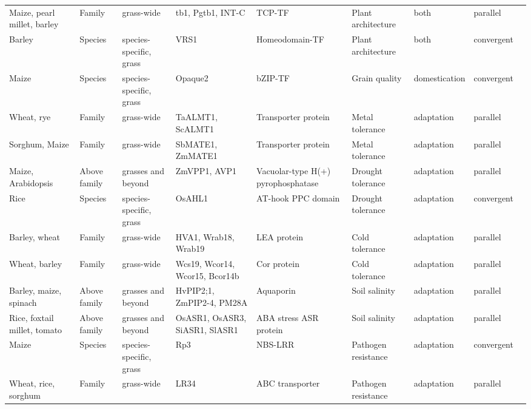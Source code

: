 \documentclass[12pt]{article}
\begin{document}
\begin{table}
\begin{center}
\begin{tabular}{G{3.5cm}G{2.5cm}C{3.10cm}C{3.5cm}C{1.95cm}G{2.0cm}G{1.8cm}G{1.5cm}G{1.5cm}}
Maize, pearl millet, barley & Family & grass-wide & tb1, Pgtb1, INT-C & TCP-TF & Plant architecture & both & parallel & \citep{Studer2011, Remigereau2011, Ramsay2011}\\
Barley & Species & species-specific, grass & VRS1 & Homeodomain-TF & Plant architecture & both & convergent & \citep{Martin2013}\\
Maize & Species & species-specific, grass & Opaque2 & bZIP-TF & Grain quality & domestication & convergent & \citep{Martin2013}\\
Wheat, rye & Family & grass-wide & TaALMT1, ScALMT1 & Transporter protein & Metal tolerance & adaptation & parallel & \citep{Martin2013}\\
Sorghum, Maize & Family & grass-wide & SbMATE1, ZmMATE1 & Transporter protein & Metal tolerance & adaptation & parallel & \citep{Martin2013}\\
Maize, Arabidopsis & Above family & grasses and beyond & ZmVPP1, AVP1 & Vacuolar-type H(+) pyrophosphatase & Drought tolerance & adaptation & parallel & \citep{Wang2016}\\
Rice & Species & species-specific, grass & OsAHL1 & AT-hook PPC domain & Drought tolerance & adaptation & convergent & \citep{Zhou2016}\\
Barley, wheat & Family & grass-wide & HVA1, Wrab18, Wrab19 & LEA protein & Cold tolerance & adaptation & parallel & \citep{Hong1988, pmid16755132}\\
Wheat, barley & Family & grass-wide & Wcs19, Wcor14, Wcor15, Bcor14b & Cor protein & Cold tolerance & adaptation & parallel & \citep{Takumi2003}\\
Barley, maize, spinach & Above family & grasses and beyond & HvPIP2;1, ZmPIP2-4, PM28A & Aquaporin & Soil salinity & adaptation & parallel & \citep{Katsuhara2002, Zhu2005, Fotiadis2000}\\
Rice, foxtail millet, tomato & Above family & grasses and beyond & OsASR1, OsASR3, SiASR1, SlASR1 & ABA stress ASR protein & Soil salinity & adaptation & parallel & \citep{Li2017, Konrad2008}\\
Maize & Species & species-specific, grass & Rp3 & NBS-LRR & Pathogen resistance & adaptation & convergent & \citep{pmid12242248}\\
Wheat, rice, sorghum & Family & grass-wide & LR34 & ABC transporter & Pathogen resistance & adaptation & parallel & \citep{Krattinger2010}\\
\end{tabular}
\end{center}
\end{table}
\end{document}

